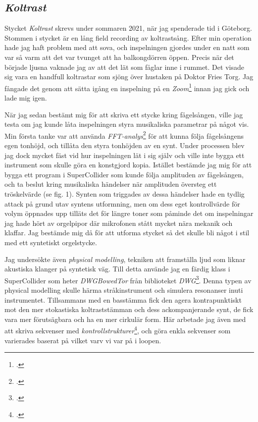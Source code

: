 \documentclass{article}
\begin{document}
\subsection{\emph{Koltrast}}\nocite{KOLTRAST}
Stycket \emph{Koltrast} skrevs under sommaren 2021, när jag spenderade tid i Göteborg. Stommen i stycket är en
lång field recording av koltrastsång. Efter min operation hade jag haft problem med att sova, och inspelningen
gjordes under en natt som var så varm att det var tvunget att ha balkongdörren öppen. Precis när det började
ljusna vaknade jag av att det lät som fåglar inne i rummet. Det visade sig vara en handfull koltrastar som
sjöng över hustaken på Doktor Fries Torg. Jag fångade det genom att sätta igång en inspelning på en  
\emph{Zoom}\footcite{zoom} innan
jag gick och lade mig igen. 

När jag sedan bestämt mig för att skriva ett stycke kring fågelsången, ville jag
testa om jag kunde låta inspelningen styra musikaliska parametrar på något vis. Min första tanke var att
använda \emph{FFT-analys}\footcite[189-199]{audioFX} för att kunna följa	
fågelsångens egen tonhöjd, och tillåta den styra tonhöjden av en synt. Under processen blev jag dock
mycket fäst vid hur inspelningen lät i sig själv och ville inte bygga ett instrument som skulle göra en
konstgjord kopia. Istället bestämde jag mig för att bygga ett program i SuperCollider som kunde följa
amplituden av fågelsången, och ta beslut kring musikaliska händelser när amplituden översteg ett tröskelvärde
(se fig. 1). Synten som triggades av dessa händelser hade en tydlig attack på grund utav syntens utformning,
men om dess eget kontrollvärde för volym öppnades upp tilläts det för längre toner som påminde det om
inspelningar jag hade hört av orgelpipor där mikrofonen stått mycket nära mekanik och klaffar. Jag bestämde
mig då för att utforma stycket så det skulle bli något i stil med ett syntetiskt orgelstycke.

Jag undersökte även \emph{physical modelling}, tekniken att framställa ljud som liknar akustiska klanger på
syntetisk väg. Till detta använde jag en färdig klass i SuperCollider som heter \emph{DWGBowedTor} från
biblioteket \emph{DWG}\footcite{dwg}. Denna typen av physical modelling skulle härma stråkinstrument och
simulera resonanser inuti instrumentet. Tillsammans med en basstämma fick den agera kontrapunktiskt mot den mer
stokastiska koltraststämman och dess ackompanjerande synt, de fick vara mer förutsägbara och ha en mer
cirkulär form. Här arbetade jag även med att skriva sekvenser med \emph{kontrollstrukturer}\footcite{ctrl},
och göra enkla sekvenser som varierades baserat på vilket varv vi var på i loopen.
\pagebreak
\end{document}
